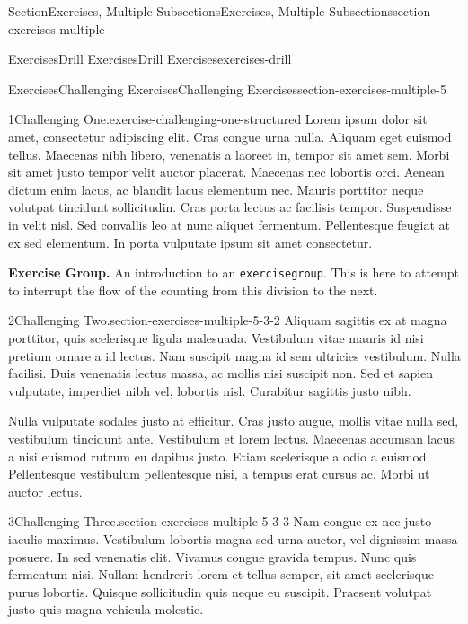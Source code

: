 \documentclass[twoside,10pt,]{article}
\newcommand{\mono}[1]{\texttt{#1}}
\numberwithin{equation}{section}
\begin{document}
\begin{sectionptx}{Section}{Exercises, Multiple Subsections}{}{Exercises, Multiple Subsections}{}{}{section-exercises-multiple}
\begin{exercises-subsection}{Exercises}{Drill Exercises}{}{Drill Exercises}{}{}{exercises-drill}
\end{exercises-subsection}
%
%
\typeout{************************************************}
\typeout{************************************************}
%
\begin{exercises-subsection}{Exercises}{Challenging Exercises}{}{Challenging Exercises}{}{}{section-exercises-multiple-5}
\begin{divisionexercise}{1}{Challenging One.}{}{exercise-challenging-one-structured}%
Lorem ipsum dolor sit amet, consectetur adipiscing elit. Cras congue urna nulla. Aliquam eget euismod tellus. Maecenas nibh libero, venenatis a laoreet in, tempor sit amet sem. Morbi sit amet justo tempor velit auctor placerat. Maecenas nec lobortis orci. Aenean dictum enim lacus, ac blandit lacus elementum nec. Mauris porttitor neque volutpat tincidunt sollicitudin. Cras porta lectus ac facilisis tempor. Suspendisse in velit nisl. Sed convallis leo at nunc aliquet fermentum. Pellentesque feugiat at ex sed elementum. In porta vulputate ipsum sit amet consectetur.%
\end{divisionexercise}%
\par\medskip\noindent%
\textbf{Exercise Group.}\space\space%
An introduction to an \mono{exercisegroup}.  This is here to attempt to interrupt the flow of the counting from this division to the next.%
\begin{exercisegroup}
\begin{divisionexerciseeg}{2}{Challenging Two.}{}{section-exercises-multiple-5-3-2}%
Aliquam sagittis ex at magna porttitor, quis scelerisque ligula malesuada. Vestibulum vitae mauris id nisi pretium ornare a id lectus. Nam suscipit magna id sem ultricies vestibulum. Nulla facilisi. Duis venenatis lectus massa, ac mollis nisi suscipit non. Sed et sapien vulputate, imperdiet nibh vel, lobortis nisl. Curabitur sagittis justo nibh.%
\par
Nulla vulputate sodales justo at efficitur. Cras justo augue, mollis vitae nulla sed, vestibulum tincidunt ante. Vestibulum et lorem lectus. Maecenas accumsan lacus a nisi euismod rutrum eu dapibus justo. Etiam scelerisque a odio a euismod. Pellentesque vestibulum pellentesque nisi, a tempus erat cursus ac. Morbi ut auctor lectus.%
\end{divisionexerciseeg}%
\begin{divisionexerciseeg}{3}{Challenging Three.}{}{section-exercises-multiple-5-3-3}%
Nam congue ex nec justo iaculis maximus. Vestibulum lobortis magna sed urna auctor, vel dignissim massa posuere. In sed venenatis elit. Vivamus congue gravida tempus. Nunc quis fermentum nisi. Nullam hendrerit lorem et tellus semper, sit amet scelerisque purus lobortis. Quisque sollicitudin quis neque eu suscipit. Praesent volutpat justo quis magna vehicula molestie.%

\end{divisionexerciseeg}
\end{exercisegroup}
\end{exercises-subsection}
\end{sectionptx}
\end{document}
